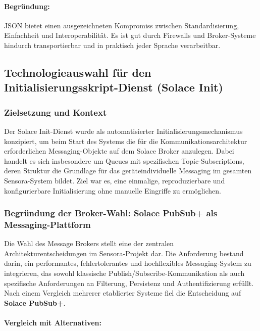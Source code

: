\paragraph*{Begr\"undung:}

JSON bietet einen ausgezeichneten Kompromiss zwischen Standardisierung, Einfachheit und Interoperabilität. Es ist gut durch Firewalls und Broker-Systeme hindurch transportierbar und in praktisch jeder Sprache verarbeitbar.

\subsection{Technologieauswahl für den Initialisierungsskript-Dienst (Solace Init)}
\subsubsection*{Zielsetzung und Kontext}
Der Solace Init-Dienst wurde als automatisierter Initialisierungsmechanismus konzipiert, um beim Start des Systems die f\"ur die Kommunikationsarchitektur erforderlichen Messaging-Objekte auf dem Solace Broker anzulegen. Dabei handelt es sich insbesondere um Queues mit spezifischen Topic-Subscriptions, deren Struktur die Grundlage f\"ur das ger\"ateindividuelle Messaging im gesamten Sensora-System bildet. Ziel war es, eine einmalige, reproduzierbare und konfigurierbare Initialisierung ohne manuelle Eingriffe zu erm\"oglichen.

\subsubsection*{Begr\"undung der Broker-Wahl: Solace PubSub+ als Messaging-Plattform}
Die Wahl des Message Brokers stellt eine der zentralen Architekturentscheidungen im Sensora-Projekt dar. Die Anforderung bestand darin, ein performantes, fehlertolerantes und hochflexibles Messaging-System zu integrieren, das sowohl klassische Publish/Subscribe-Kommunikation als auch spezifische Anforderungen an Filterung, Persistenz und Authentifizierung erf\"ullt. Nach einem Vergleich mehrerer etablierter Systeme fiel die Entscheidung auf \textbf{Solace PubSub+}.\cite{solace_overview}

\paragraph*{Vergleich mit Alternativen:}

